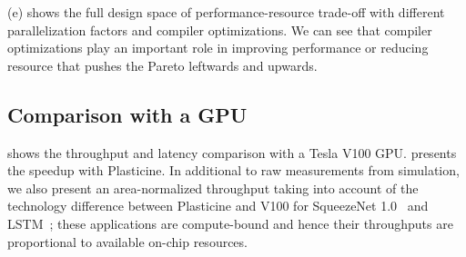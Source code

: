  (e) shows the full design space of performance-resource trade-off with
different parallelization factors and compiler optimizations.
We can see that compiler optimizations play an important role in improving performance or
reducing resource that pushes the Pareto leftwards and upwards.

\subsection{Comparison with a GPU}

 shows the throughput and latency comparison with a Tesla V100 GPU.
 presents the speedup with Plasticine.
In additional to raw measurements from simulation, we also present an area-normalized throughput
taking into account of the technology difference between Plasticine and V100 
for SqueezeNet 1.0~\cite{squeezenet} and LSTM~\cite{lstm}; 
these applications are compute-bound and hence their throughputs are proportional to available 
on-chip resources.

